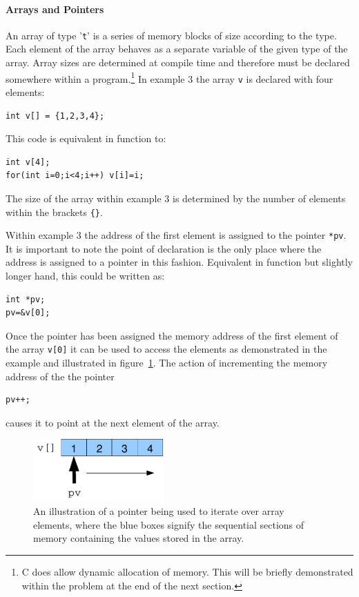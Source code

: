 \documentclass[11pt]{scrartcl}
\begin{document}
\paragraph{Arrays and Pointers}
An array of type '\texttt{t}' is a series of memory blocks of size
according to the type.  Each element of the array behaves as a
separate variable of the given type of the array.  Array sizes are
determined at compile time and therefore must be declared somewhere
within a program.\footnote{C does allow dynamic allocation of memory.
This will be briefly demonstrated within the problem at the end of the
next section.}  In example 3 the array \texttt{v} is declared with
four elements:
\begin{lstlisting}
int v[] = {1,2,3,4};
\end{lstlisting}
This code is equivalent in function to:
\begin{lstlisting}
int v[4];
for(int i=0;i<4;i++) v[i]=i;
\end{lstlisting}
The size of the array within example 3 is determined by the number of
elements within the brackets \texttt{\{\}}.

Within example 3 the address of the first element is assigned to the
pointer \texttt{*pv}.  It is important to note the point of
declaration is the only place where the address is assigned to a
pointer in this fashion.  Equivalent in function but slightly longer
hand, this could be written as:
\begin{lstlisting}
int *pv;
pv=&v[0];
\end{lstlisting}
Once the pointer has been assigned the memory address of the first
element of the array \texttt{v[0]} it can be used to access the
elements as demonstrated in the example and illustrated in
figure~\ref{figure:pointer_array}.  The action of incrementing the
memory address of the the pointer
\begin{lstlisting}
pv++;
\end{lstlisting}
causes it to point at the next element of the array.

\begin{figure}[h]
\begin{center}
\includegraphics[width=5cm]{figures/pointer_array}
\caption{An illustration of a pointer being used to iterate over array elements, where the blue boxes signify the sequential sections of memory containing the values stored in the array.
\label{figure:pointer_array}}
\end{center}
\end{figure}
\end{document}
